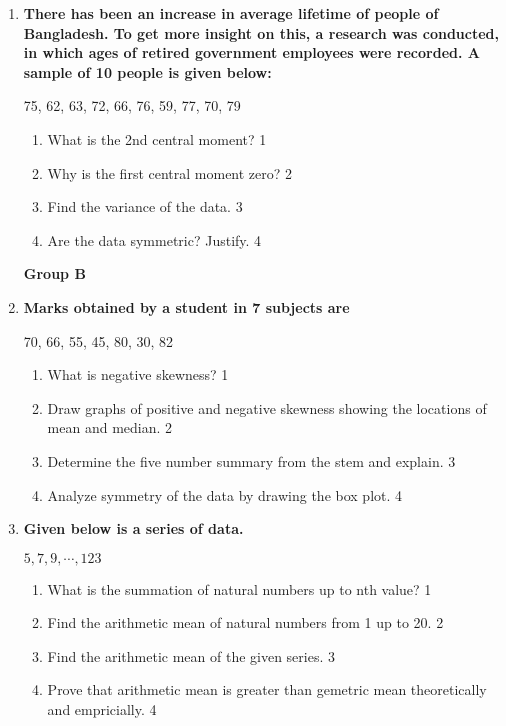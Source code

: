 \documentclass{article}
\begin{document}
\begin{enumerate}
   \item
	  \textbf{There has been an increase in average lifetime of people of Bangladesh. To get more insight on this, a research was conducted, in which ages of retired government employees were recorded. A sample of 10 people is given below:}
	  
	  \begin{center}
	  75, 62, 63, 72, 66, 76, 59, 77, 70, 79
	  \end{center}
    \begin{enumerate}
    \item
	What is the 2nd central moment? \hfill 1
    \item
	Why is the first central moment zero? \hfill 2
    \item  
	Find the variance of the data. \hfill 3
    \item
	Are the data symmetric? Justify. \hfill 4
  \end{enumerate}
 
\begin{center}
\textbf{Group B}
\end{center}

   \item
	  \textbf{Marks obtained by a student in 7 subjects are} 
	  \begin{center}
	  70, 66, 55, 45, 80, 30, 82
	\end{center}
  
  \begin{enumerate}
    \item
	What is negative skewness? \hfill 1
    \item
	Draw graphs of positive and negative skewness showing the locations of mean and median. \hfill 2
    \item  
	Determine the five number summary from the stem and explain. \hfill 3
    \item
	Analyze symmetry of the data by drawing the box plot. \hfill 4
\end{enumerate}
  
  
     \item
	  \textbf{Given below is a series of data.} 
	  
	  	    \begin{center}
	 $5, 7, 9, \cdots , 123$
	    \end{center}
  
  \begin{enumerate}
    \item
	What is the summation of natural numbers up to nth value? \hfill 1
    \item
	Find the arithmetic mean of natural numbers from 1 up to 20. \hfill 2
    \item  
	Find the arithmetic mean of the given series. \hfill 3
    \item
	Prove that arithmetic mean is greater than gemetric mean theoretically and empricially. \hfill 4
  \end{enumerate}
  

\end{enumerate}
\end{document}
